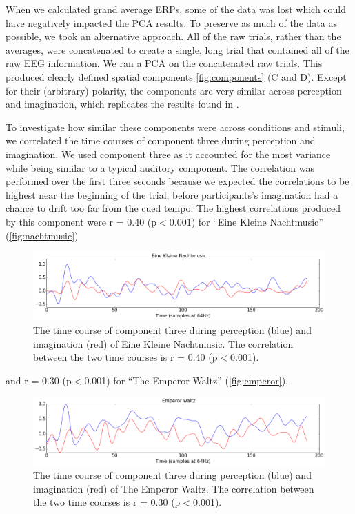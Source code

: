 When we calculated grand average \acp{ERP}, some of the data was lost which could have negatively impacted the \ac{PCA} results.
To preserve as much of the data as possible, we took an alternative approach. 
All of the raw trials, rather than the averages, were concatenated to create a single, long trial that contained all of the raw EEG information.
We ran a \ac{PCA} on the concatenated raw trials. 
This produced clearly defined spatial components \autoref{fig:components} (C and D).
Except for their (arbitrary) polarity, the components are very similar across perception and imagination, which replicates the results found in \cite{schaefer_name_2011}.

To investigate how similar these components were across conditions and stimuli, we correlated the time courses of component three during perception and imagination.
We used component three as it accounted for the most variance while being similar to a typical auditory component.
The correlation was performed over the first three seconds because we expected the correlations to be highest near the beginning of the trial, before participants's imagination had a chance to drift too far from the cued tempo.
The highest correlations produced by this component were r = 0.40 (p$<$0.001) for ``Eine Kleine Nachtmusic'' (\autoref{fig:nachtmusic})
\begin{figure}[htbp]
  \centerline{\includegraphics[scale=0.4]{Figures/TimeCourse-EineKleineCorrelation}}
  \caption{The time course of component three during perception (blue) and imagination (red) of Eine Kleine Nachtmusic. The correlation between the two time courses is r = 0.40 (p$<$0.001).}
  \label{fig:nachtmusic}
\end{figure}
and r = 0.30 (p$<$0.001) for ``The Emperor Waltz'' (\autoref{fig:emperor}).
\begin{figure}[htbp]
  \centerline{\includegraphics[scale=0.4]{Figures/TimeCourse-EmperorCorrelation}}
  \caption{The time course of component three during perception (blue) and imagination (red) of The Emperor Waltz. The correlation between the two time courses is r = 0.30 (p$<$0.001).}
  \label{fig:emperor}
\end{figure}
